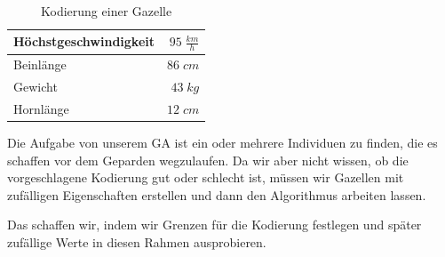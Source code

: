             \begin{multicols}{2}
                \hfill \\[-10mm]
                \begin{table}[H]
                    \begin{center}
                    \begin{tabular}{ |l|r| } 
                        \hline
                        Höchstgeschwindigkeit    & $ 95\; \frac{km}{h}$   \\ \hline
                        Beinlänge                & $ 86\; cm          $   \\ \hline
                        Gewicht                  & $ 43\; kg          $   \\ \hline
                        Hornlänge                & $ 12\; cm          $   \\ \hline
                    \end{tabular}
                    \end{center}
                    \caption{Kodierung einer Gazelle \label{fig:gaz-encoding}}
                \end{table}

                \noindent
                Die Aufgabe von unserem GA ist ein oder mehrere Individuen zu finden, die es schaffen vor dem Geparden wegzulaufen. Da wir aber nicht wissen, ob die vorgeschlagene Kodierung gut oder schlecht ist, müssen wir Gazellen mit zufälligen Eigenschaften erstellen und dann den Algorithmus arbeiten lassen.
            \end{multicols}
            \noindent
            Das schaffen wir, indem wir Grenzen für die Kodierung festlegen und später zufällige Werte in diesen Rahmen ausprobieren.

